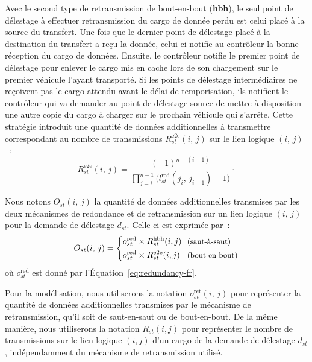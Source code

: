  
Avec le second type de retransmission de bout-en-bout (\textbf{hbh}), le seul point de délestage à effectuer retransmission du cargo de donnée perdu est celui placé à la source du transfert. Une fois que le dernier point de délestage placé à la destination du transfert a reçu la donnée, celui-ci notifie au contrôleur la bonne réception du cargo de données. Ensuite, le contrôleur notifie le premier point de délestage pour enlever le cargo mis en cache lors de son chargement sur le premier véhicule l’ayant transporté. Si les points de délestage intermédiaires ne reçoivent pas le cargo attendu avant le délai de temporisation, ils notifient le contrôleur qui va demander au point de délestage source de mettre à disposition une autre copie du cargo à charger sur le prochain véhicule qui s’arrête. Cette stratégie introduit une quantité de données additionnelles à transmettre correspondant au nombre de transmissions $R^{\textrm{e2e}}_{st}(i,\,j)$ sur le lien logique $(i,\,j)$~: 
\begin{equation} 
    R^{\textrm{e2e}}_{st}(i,\,j) = \frac{(-1)^{n-(i-1)}}{\prod_{j=i}^{n-1}\big(l_{st}^{\text{red}}(j_{i},\,j_{i+1})-1\big)}\cdot 
\end{equation} 
 
 
Nous notons $O_{st}(i,\,j)$ la quantité de données additionnelles transmises par les deux mécanismes de redondance et de retransmission sur un lien logique $(i,\,j)$ pour la demande de délestage $d_{st}$. Celle-ci est exprimée par~: 
\begin{equation} 
    O_{st}(i,\,j) = \begin{dcases} 
    o_{st}^{\text{red}} \times R_{st}^{\textrm{hbh}}(i,j) & \text{\!\!\small (saut-à-saut)}\\ 
    o_{st}^{\text{red}} \times R_{st}^{\textrm{e2e}}(i,j) & \text{\!\!\small (bout-en-bout)} 
    \end{dcases} 
\end{equation} 
\noindent où $o_{st}^{\text{red}}$ est donné par l’Équation~\ref{eq:redundancy-fr}. 
 
 
Pour la modélisation, nous utiliserons la notation $o^{\text{ret}}_{st}(i,\,j)$ pour représenter la quantité de données additionnelles transmises par le mécanisme de retransmission, qu’il soit de saut-en-saut ou de bout-en-bout. De la même manière, nous utiliserons la notation $R_{st}(i,j)$ pour représenter le nombre de transmissions sur le lien logique $(i,j)$ d’un cargo de la demande de délestage $d_{st}$, indépendamment du mécanisme de retransmission utilisé. 
 
